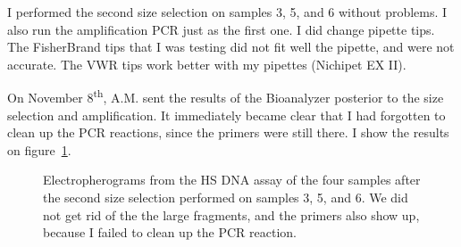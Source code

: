 \documentclass[a4paper,12pt]{article}
\begin{document}
I performed the second size selection on samples 3, 5, and 6 without problems. I also run the amplification PCR just as the first one. I did change pipette tips. The FisherBrand tips that I was testing did not fit well the pipette, and were not accurate. The VWR tips work better with my pipettes (Nichipet EX II).

On November 8\textsuperscript{th}, A.M. sent the results of the Bioanalyzer posterior to the size selection and amplification. It immediately became clear that I had forgotten to clean up the PCR reactions, since the primers were still there. I show the results on figure~\ref{fig:sizeselection2}.

\begin{figure}
\caption{Electropherograms from the HS DNA assay of the four samples after the second size selection performed on samples 3, 5, and 6. We did not get rid of the the large fragments, and the primers also show up, because I failed to clean up the PCR reaction.}\label{fig:sizeselection2}
\end{figure}



\end{document}
